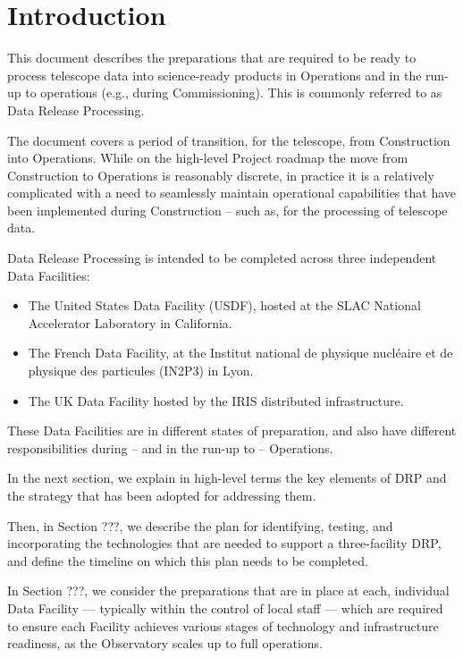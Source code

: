 \section{Introduction}

This document describes the preparations that are required to be ready to process telescope data into science-ready products in Operations and in the run-up to operations (e.g., during Commissioning). This is commonly referred to as Data Release Processing.

The document covers a period of transition, for the telescope, from Construction into Operations. While on the high-level Project roadmap the move from Construction to Operations is reasonably discrete, in practice it is a relatively complicated with a need to seamlessly maintain operational capabilities that have been implemented during Construction -- such as, for the processing of telescope data.

Data Release Processing is intended to be completed across three independent Data Facilities:

\begin{itemize}

\item The United States Data Facility (USDF), hosted at the SLAC National Accelerator Laboratory in California.
  
\item The French Data Facility, at the Institut national de physique nucléaire et de physique des particules (IN2P3) in Lyon.

\item The UK Data Facility hosted by the IRIS distributed infrastructure.

\end{itemize}

These Data Facilities are in different states of preparation, and also have different responsibilities during -- and in the run-up to -- Operations.

In the next section, we explain in high-level terms the key elements of DRP and the strategy that has been adopted for addressing them.

Then, in Section ???, we describe the plan for identifying, testing, and incorporating the technologies that are needed to support a three-facility DRP, and define the timeline on which this plan needs to be completed.

In Section ???, we consider the preparations that are in place at each, individual Data Facility --- typically within the control of local staff --- which are required to ensure each Facility achieves various stages of technology and infrastructure readiness, as the Observatory scales up to full operations.



